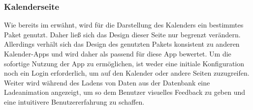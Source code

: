 \subsubsection{Kalenderseite}%
Wie bereits im  erwähnt, wird für die Darstellung des Kalenders ein bestimmtes Paket genutzt. Daher ließ sich das Design dieser Seite nur begrenzt verändern. Allerdings verhält sich das Design des genutzten Pakets konsistent zu anderen Kalender-Apps und wird daher als passend für diese App bewertet.\newline%
Um die sofortige Nutzung der App zu ermöglichen, ist weder eine initiale Konfiguration noch ein Login erforderlich, um auf den Kalender oder andere Seiten zuzugreifen. Weiter wird während des Ladens von Daten aus der Datenbank eine Ladeanimation angezeigt, um so dem Benutzer visuelles Feedback zu geben und eine intuitivere Benutzererfahrung zu schaffen.%
%
